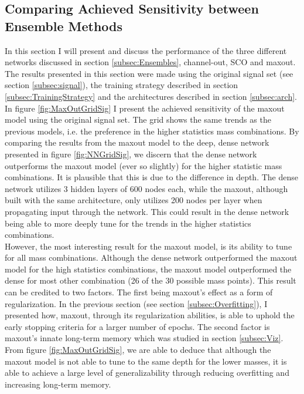 \subsection{Comparing Achieved Sensitivity between Ensemble Methods}
In this section I will present and discuss the performance of the three different networks discussed in section 
\ref{subsec:Ensembles}, channel-out, \ac{SCO} and maxout. The results presented in this section were made using the
original signal set (see section \ref{subsec:signal}), the training strategy described in section \ref{subsec:TrainingStrategy}
and the architectures described in section \ref{subsec:arch}.
\\
In figure \ref{fig:MaxOutGridSig} I present the achieved sensitivity of the maxout model using the original signal set. 
The grid shows the same trends as the previous models, i.e. the preference in the higher statistics mass combinations. By comparing 
the results from the maxout model to the deep, dense network presented in figure \ref{fig:NNGridSig}, we discern that the dense 
network outperforms the maxout model (ever so slightly) for the higher statistic mass combinations. It is plausible that this is due 
to the difference in depth. The dense network utilizes 3 hidden layers of 600 nodes each, while the maxout, although built with the 
same architecture, only utilizes 200 nodes per layer when propagating input through the network. This could result in the dense network 
being able to more deeply tune for the trends in the higher statistics combinations.
\\
However, the most interesting result for the maxout model, is its ability to tune for all mass combinations. Although the dense network
outperformed the maxout model for the high statistics combinations, the maxout model outperformed the dense for most other combination (26 of 
the 30 possible mass points). This result can be credited to two factors. The first being maxout's effect as a form of regularization. In the previous 
section (see section \ref{subsec:Overfitting}), I presented how, maxout, through its regularization abilities, is able to 
uphold the early stopping criteria for a larger number of epochs. The second factor is maxout's innate long-term memory which was studied
in section \ref{subsec:Viz}. From figure \ref{fig:MaxOutGridSig}, we are able to deduce that although the maxout model is not able to tune 
to the same depth for the lower masses, it is able to achieve a large level of generalizability through reducing overfitting and increasing 
long-term memory.\\
